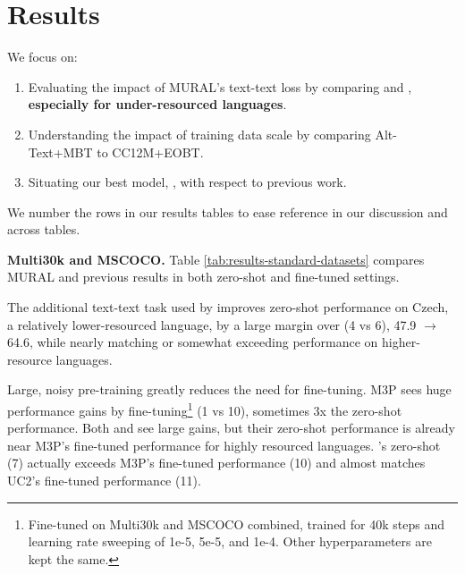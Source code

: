         
        \section{Results}
        


        We focus on:
        
        \begin{enumerate}
            \item Evaluating the impact of MURAL's text-text loss by comparing \alignmling and \muralbase, \textbf{especially for under-resourced languages}.
            \item Understanding the impact of training data scale by comparing Alt-Text+MBT to CC12M+EOBT.
            \item Situating our best model, \murallarge, with respect to previous work.
        \end{enumerate}
        \noindent
        We number the rows in our results tables to ease reference in our discussion and across tables.
        
        \textbf{Multi30k and MSCOCO.} Table \ref{tab:results-standard-datasets} compares MURAL and previous results \cite{burns2020eccv, huang2020m3p,zhou2021uc2, jia2021scaling} in both zero-shot and fine-tuned settings.
        
        The additional text-text task used by \muralbase improves zero-shot performance on Czech, a relatively lower-resourced language, by a large margin over \alignmling (4 vs 6), 47.9 $\rightarrow$ 64.6,  while nearly matching or somewhat exceeding performance on higher-resource languages. 
        
        Large, noisy pre-training greatly reduces the need for fine-tuning. M3P sees huge performance gains by fine-tuning\footnote{Fine-tuned on Multi30k and MSCOCO combined, trained for 40k steps and learning rate sweeping of 1e-5, 5e-5, and 1e-4. Other hyperparameters are kept the same.} (1 vs 10), sometimes 3x the zero-shot performance. Both \alignmling and \muralbase see large gains, but their zero-shot performance is already near M3P's fine-tuned performance for highly resourced languages. \murallarge's zero-shot (7) actually exceeds M3P's fine-tuned performance (10) and almost matches UC2's fine-tuned performance (11).
        
